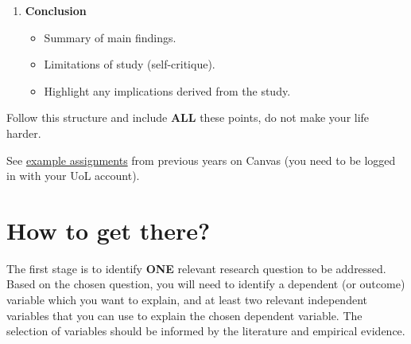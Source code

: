 \documentclass[
  letterpaper,
  DIV=11,
  numbers=noendperiod]{scrreprt}
\providecommand{\tightlist}{%
  \setlength{\itemsep}{0pt}\setlength{\parskip}{0pt}}
\begin{document}
\begin{enumerate}
  \begin{itemize}
  \tightlist
  \item
    Descriptive statistics and summary of the variables employed,
    supported by tables or/and charts.
  \item
    Correct interpretation of correlation coefficients, statistical
    significance, and model fit.
  \item
    Usage and results of an appropriate multivariate regression model.
  \item
    Interpretation of the results, including links and contrasts to
    existing literature.
  \item
    Selective illustrations (graphs and tables) to make your findings as
    clear as possible.
  \end{itemize}
\item
  \textbf{Conclusion}

  \begin{itemize}
  \tightlist
  \item
    Summary of main findings.
  \item
    Limitations of study (self-critique).
  \item
    Highlight any implications derived from the study.
  \end{itemize}
\end{enumerate}

Follow this structure and include \textbf{ALL} these points, do not make
your life harder.

See
\href{https://canvas.liverpool.ac.uk/courses/93312/pages/example-assignments?module_item_id=2727709}{example
assignments} from previous years on Canvas (you need to be logged in
with your UoL account).

\section*{How to get there?}\label{how-to-get-there}


The first stage is to identify \textbf{ONE} relevant research question
to be addressed. Based on the chosen question, you will need to identify
a dependent (or outcome) variable which you want to explain, and at
least two relevant independent variables that you can use to explain the
chosen dependent variable. The selection of variables should be informed
by the literature and empirical evidence.
\end{document}
